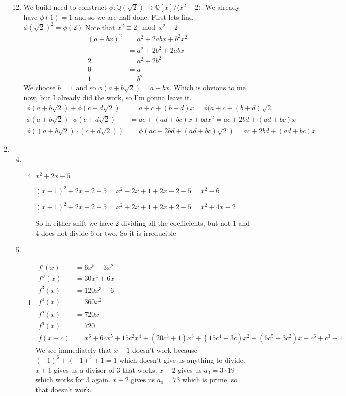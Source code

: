 \documentclass[letterpaper]{article}
\begin{document}
\begin{enumerate}
\begin{enumerate}
  \setcounter{enumii}{11}
  \item
  We build need to construct $\phi: \mathbb{Q}(\sqrt{2})\to\mathbb{Q}[x]/\langle x^2-2\rangle$. We already have $\phi(1)=1$ and so we are half done. First lets find $\phi(\sqrt{2})^2=\phi(2)$
  Note that $x^2\equiv 2\mod x^2-2$
  \begin{align*}
    (a+bx)^2&=a^2+2abx+b^2x^2\\
    &=a^2+2b^2+2abx\\
    2&=a^2+2b^2\\
    0&=a\\
    1&=b^2
  \end{align*}
  We choose $b=1$ and so $\phi(a+b\sqrt{2})=a+bx$. Which is obvious to me now, but I already did the work, so I'm gonna leave it.
  \begin{align*}
    \phi(a+b\sqrt{2})+\phi(c+d\sqrt{2})&=a+c+(b+d)x=\phi(a+c+(b+d)\sqrt{2}\\
    \phi(a+b\sqrt{2})\cdot\phi(c+d\sqrt{2})&=ac+(ad+bc)x+bdx^2=ac+2bd+(ad+bc)x\\
    \phi((a+b\sqrt{2})\cdot(c+d\sqrt{2}))&=\phi(ac+2bd+(ad+bc)\sqrt{2})=ac+2bd+(ad+bc)x
  \end{align*}
  \end{enumerate}
\item
  \begin{enumerate}
  \setcounter{enumii}{3}
  \item
    \begin{enumerate}
    \setcounter{enumiii}{3}
    \item
      $x^2+2x-5$

      $(x-1)^2+2x-2-5=x^2-2x+1+2x-2-5=x^2-6$

      $(x+1)^2+2x+2-5=x^2+2x+1+2x+2-5=x^2+4x-2$

      So in either shift we have 2 dividing all the coefficients, but not $1$ and 4 does not divide 6 or two. So it is irreducible
    \end{enumerate}
  \setcounter{enumii}{16}
  \item
    \begin{enumerate}
    \item
    \begin{align*}
      f'(x)&=6x^5+3x^2\\
      f''(x)&=30x^4+6x\\
      f^3(x)&=120x^3+6\\
      f^4(x)&=360x^2\\
      f^5(x)&=720x\\
      f^6(x)&=720\\
      f(x+c)&=x^6+6cx^5+15c^2x^4+(20c^3+1)x^3+(15c^4+3c)x^2+(6c^5+3c^2)x+c^6+c^3+1
    \end{align*}
    We see immediately that $x-1$ doesn't work because $(-1)^6+(-1)^3+1=1$ which doesn't give us anything to divide. $x+1$ gives us a divisor of $3$ that works. $x-2$ gives us $a_0=3\cdot19$ which works for $3$ again. $x+2$ gives us $a_0=73$ which is prime, so that doesn't work.
    \end{enumerate}
  \end{enumerate}
\end{enumerate}
\end{document}
